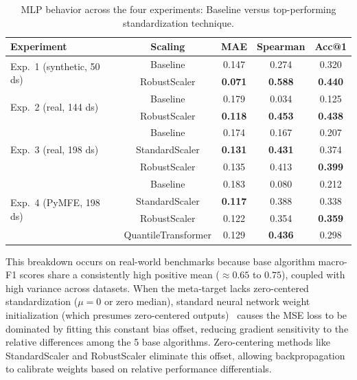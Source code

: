 \documentclass[12pt]{article}
\begin{document}
\begin{table}[ht]
\centering
\caption{MLP behavior across the four experiments: Baseline versus top-performing standardization technique.}
\label{tab:mlp_comparison}
\footnotesize
\begin{tabular}{lcccc}
\toprule
\textbf{Experiment} & \textbf{Scaling} & \textbf{MAE} & \textbf{Spearman} & \textbf{Acc@1} \\
\midrule
\multirow{2}{*}{Exp.\ 1 (synthetic, 50 ds)} & Baseline     & 0.147 & 0.274 & 0.320 \\
                                             & RobustScaler & \textbf{0.071} & \textbf{0.588} & \textbf{0.440} \\
\midrule
\multirow{2}{*}{Exp.\ 2 (real, 144 ds)}     & Baseline     & 0.179 & 0.034 & 0.125 \\
                                             & RobustScaler & \textbf{0.118} & \textbf{0.453} & \textbf{0.438} \\
\midrule
\multirow{3}{*}{Exp.\ 3 (real, 198 ds)}     & Baseline     & 0.174 & 0.167 & 0.207 \\
                                             & StandardScaler & \textbf{0.131} & \textbf{0.431} & 0.374 \\
                                             & RobustScaler & 0.135 & 0.413 & \textbf{0.399} \\
\midrule
\multirow{4}{*}{Exp.\ 4 (PyMFE, 198 ds)}    & Baseline     & 0.183 & 0.080 & 0.212 \\
                                             & StandardScaler & \textbf{0.117} & 0.388 & 0.338 \\
                                             & RobustScaler & 0.122 & 0.354 & \textbf{0.359} \\
                                             & QuantileTransformer & 0.129 & \textbf{0.436} & 0.298 \\
\bottomrule
\end{tabular}
\end{table}

This breakdown occurs on real-world benchmarks because base algorithm macro-F1 scores share a consistently high positive mean ($\approx 0.65$ to $0.75$), coupled with high variance across datasets. When the meta-target lacks zero-centered standardization ($\mu=0$ or zero median), standard neural network weight initialization (which presumes zero-centered outputs)~\cite{glorot2010understanding,lecun2012efficient} causes the MSE loss to be dominated by fitting this constant bias offset, reducing gradient sensitivity to the relative differences among the 5 base algorithms. Zero-centering methods like StandardScaler and RobustScaler eliminate this offset, allowing backpropagation to calibrate weights based on relative performance differentials.
\end{document}
